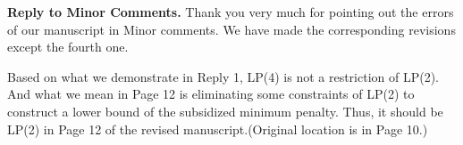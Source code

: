 \documentclass[11pt]{article}
\begin{document}
\noindent \textbf{Reply to Minor Comments.}
Thank you very much for pointing out the errors of our manuscript in Minor comments. We have made the corresponding revisions except the fourth one.

Based on what we demonstrate in Reply 1, LP(4) is not a restriction of LP(2). And what we mean in Page 12 is eliminating some constraints of LP(2) to construct a lower bound of the subsidized minimum penalty. Thus, it should be LP(2) in Page 12 of the revised manuscript.(Original location is in Page 10.)


%
%

%
%
%
~\\[4mm]

\newpage
\end{document}

